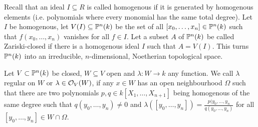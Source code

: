 \documentclass[a4paper,parskip=full,numbers=enddot]{scrreprt}
\begin{document}
\begin{defi}
\begin{rem*}
\begin{alphanumerate}
     Recall that an ideal $I\subseteq R$ is called homogenous if it is generated by homogenous elements (i.e. polynomials where every monomial has the same total degree). Let $I$ be homogenous, let $V(I)\subseteq \mathbb{P}^n(k)$ be the set of all $[x_0, \ldots, x_n]\in\mathbb{P}^n(k)$ such that $f(x_0,\ldots, x_n)$ vanishes for all $f\in I$. Let a subset $A$ of $\mathbb{P}^n(k)$ be called Zariski-closed if there is a homogenous ideal $I$ such that $A= V(I)$. This turns $\mathbb{P}^n(k)$ into an irreducible, $n$-dimensional, Noetherian topological space.
     
     Let $V\subset \mathbb{P}^n(k)$ be closed, $W\subseteq V$ open and $\lambda: W\to k$ any function. We call $\lambda$ regular on $W$ or $\lambda \in \mathcal{O}_V(W)$, if any $x\in W$ has an open neighbourhood $\Omega$ such that there are two polynomials $p,q\in k[X_1,\ldots,X_{n+1}]$ being homogenous of the same degree such that $q(y_0,\ldots,y_n) \neq 0$ and $\lambda([y_0,\ldots,y_n]) = \frac{p(y_0,\ldots,y_n}{q(y_0,\ldots,y_n)}$ for all $[y_0,\ldots,y_n]\in W\cap \Omega$.
    \end{alphanumerate}

\end{rem*}






    

\end{defi}
\end{document}
